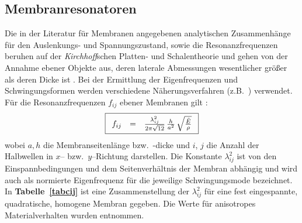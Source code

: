 \subsection{Membranresonatoren}
\label{membranreson}

Die in der Literatur für Membranen angegebenen analytischen Zusammenhänge
für den Auslenkungs- und Spannungszustand, sowie die Resonanzfrequenzen
beruhen auf der {\sl Kirchhoff}schen Platten- und Schalentheorie und gehen
von der Annahme ebener Objekte aus, deren laterale Abmessungen
wesentlicher größer als deren Dicke ist \cite{Tim87}. Bei der Ermittlung der
Eigenfrequenzen und Schwingungsformen werden verschiedene
Näherungsverfahren (z.B.\ \cite{You50}) verwendet. Für die Resonanzfrequenzen
$f_{ij}$ ebener Membranen gilt \cite{Ble84}:
%
\begin{equation}
\label{memfreq}
\fbox{$
 \displaystyle
 \begin{array}{rcl}
     f_{ij} & = & \frac{\lambda_{ij}^{2}}{2 \pi \sqrt{12}} \,
     \frac{h}{a^{2}} \, \sqrt{ \frac {\hat E}{\rho}}
 \end{array}
 $}
\end{equation}
%
wobei $a, h$ die Membranseitenlänge bzw.\ -dicke und
$i$, $j$ die Anzahl der Halbwellen in $x$-- bzw.\ $y$--Richtung darstellen.
Die Konstante $\lambda^{2}_{ij}$ ist von den Einspannbedingungen und dem
Seitenverhältnis der Membran abhängig und wird auch als normierte
Eigenfrequenz für die jeweilige Schwingungsmode bezeichnet. In
{\bf Tabelle~\ref{tabcij}} ist eine Zusammenstellung der $\lambda_{ij}^{2}$
für eine fest eingespannte, quadratische, homogene Membran gegeben.
Die Werte für anisotropes Materialverhalten wurden \cite{Pon91} entnommen.
